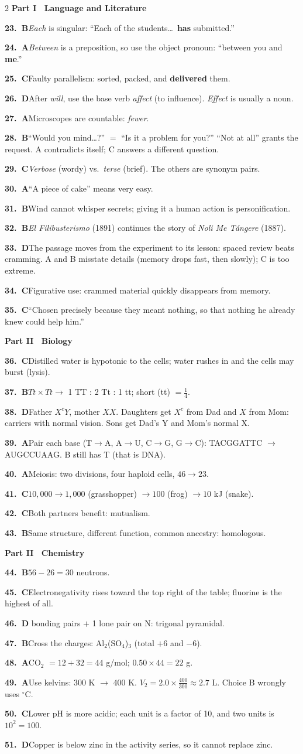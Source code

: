 \documentclass[10pt]{article}
\newcommand{\ans}[3]{\par\noindent\textbf{#1.~\textcolor{dblue}{#2}}\enspace #3}
\begin{document}
\begin{multicols}{2}
{\sffamily\bfseries\color{dblue}Part I \textbullet\ Language and Literature}
\ans{23}{B}{\emph{Each} is singular: ``Each of the students\ldots\ \textbf{has} submitted.''}
\ans{24}{A}{\emph{Between} is a preposition, so use the object pronoun: ``between you and \textbf{me}.''}
\ans{25}{C}{Faulty parallelism: sorted, packed, and \textbf{delivered} them.}
\ans{26}{D}{After \emph{will}, use the base verb \emph{affect} (to influence). \emph{Effect} is usually a noun.}
\ans{27}{A}{Microscopes are countable: \emph{fewer}.}
\ans{28}{B}{``Would you mind\ldots?'' $=$ ``Is it a problem for you?'' ``Not at all'' grants the request. A contradicts itself; C answers a different question.}
\ans{29}{C}{\emph{Verbose} (wordy) vs.\ \emph{terse} (brief). The others are synonym pairs.}
\ans{30}{A}{``A piece of cake'' means very easy.}
\ans{31}{B}{Wind cannot whisper secrets; giving it a human action is personification.}
\ans{32}{B}{\emph{El Filibusterismo} (1891) continues the story of \emph{Noli Me T\'angere} (1887).}
\ans{33}{D}{The passage moves from the experiment to its lesson: spaced review beats cramming. A and B misstate details (memory drops fast, then slowly); C is too extreme.}
\ans{34}{C}{Figurative use: crammed material quickly disappears from memory.}
\ans{35}{C}{``Chosen precisely because they meant nothing, so that nothing he already knew could help him.''}

{\sffamily\bfseries\color{dblue}Part II \textbullet\ Biology}
\ans{36}{C}{Distilled water is hypotonic to the cells; water rushes in and the cells may burst (lysis).}
\ans{37}{B}{$Tt\times Tt\to$ 1 TT : 2 Tt : 1 tt; short (tt) $=\frac14$.}
\ans{38}{D}{Father $X^cY$, mother $XX$. Daughters get $X^c$ from Dad and $X$ from Mom: carriers with normal vision. Sons get Dad's Y and Mom's normal X.}
\ans{39}{A}{Pair each base (T$\to$A, A$\to$U, C$\to$G, G$\to$C): TACGGATTC $\to$ AUGCCUAAG. B still has T (that is DNA).}
\ans{40}{A}{Meiosis: two divisions, four haploid cells, $46\to23$.}
\ans{41}{C}{$10{,}000\to1{,}000$ (grasshopper) $\to100$ (frog) $\to10$ kJ (snake).}
\ans{42}{C}{Both partners benefit: mutualism.}
\ans{43}{B}{Same structure, different function, common ancestry: homologous.}

{\sffamily\bfseries\color{dblue}Part II \textbullet\ Chemistry}
\ans{44}{B}{$56-26=30$ neutrons.}
\ans{45}{C}{Electronegativity rises toward the top right of the table; fluorine is the highest of all.}
\ans{46}{D}{3 bonding pairs $+$ 1 lone pair on N: trigonal pyramidal.}
\ans{47}{B}{Cross the charges: Al$_2$(SO$_4$)$_3$ (total $+6$ and $-6$).}
\ans{48}{A}{CO$_2$ $=12+32=44$ g/mol; $0.50\times44=22$ g.}
\ans{49}{A}{Use kelvins: 300 K $\to$ 400 K. $V_2=2.0\times\frac{400}{300}\approx2.7$ L. Choice B wrongly uses $^\circ$C.}
\ans{50}{C}{Lower pH is more acidic; each unit is a factor of 10, and two units is $10^2=100$.}
\ans{51}{D}{Copper is below zinc in the activity series, so it cannot replace zinc.}


\end{multicols}
\end{document}
